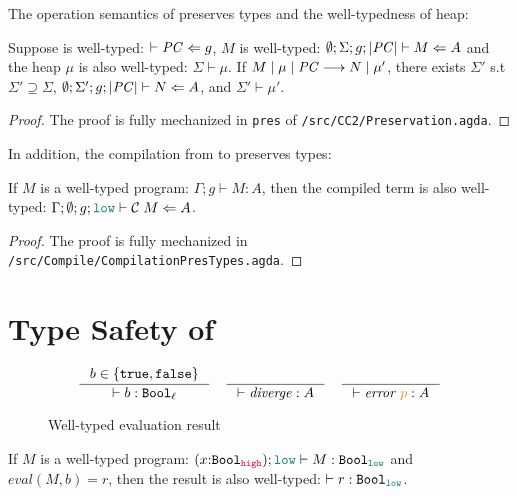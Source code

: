 The operation semantics of \CC preserves types and the well-typedness of heap:

\begin{theorem}[Preservation]
\label{thm:preservation}
Suppose \PC is well-typed:  $\vdash \mathit{PC} \Leftarrow g$,
$M$ is well-typed: $\emptyset ; \Sigma ; g ; |\mathit{PC}| \vdash M \Leftarrow A$
and the heap $\mu$ is also well-typed: $\Sigma \vdash \mu$.
If ${M}\mid{\mu}\mid{\ensuremath{\mathit{PC}}}\longrightarrow{N}\mid{\mu'}$, there exists $\Sigma'$ s.t
$\Sigma' \supseteq \Sigma$, $\emptyset ; \Sigma' ; g ; |\mathit{PC}| \vdash N \Leftarrow A$,
and $\Sigma' \vdash \mu'$.
\end{theorem}
\begin{proof}
  The proof is fully mechanized in \texttt{pres} of \texttt{/src/CC2/Preservation.agda}.
\end{proof}

In addition, the compilation from \Surface to \CC preserves types:

\begin{theorem}
  \label{thm:compile-pres}
  If $M$ is a well-typed \Surface program: $\Gamma ; g \vdash M : A$, then the
  compiled \CC term is also well-typed: $\Gamma ; \emptyset ; g ; \low \vdash
  \compile{M} \Leftarrow A$.
\end{theorem}
\begin{proof}
  The proof is fully mechanized in
  \texttt{/src/Compile/CompilationPresTypes.agda}.
\end{proof}

\section{Type Safety of \Surface}
\label{sec:surface-type-safety}

\begin{figure}[tbp]
  \raggedright
  \begin{gather*}
    \inference{b \in \{\true, \false\}}{\vdash b : \Bool_{\ell}}
    \quad
    \inference{}{\vdash \mathit{diverge} : A}
    \quad
    \inference{}{\vdash \mathit{error}\;\bl{p} : A}
  \end{gather*}
  \caption{Well-typed evaluation result}
  \label{fig:wt-result}
\end{figure}

\begin{theorem}
  \label{thm:type-safety}
  If $M$ is a well-typed \Surface program: $(x{:}\Bool_{\high});\low \vdash M : \Bool_{\low}$
  and $\mathit{eval}(M,b)=r$,
  then the result is also well-typed: $\vdash r : \Bool_{\low}$.
\end{theorem}
